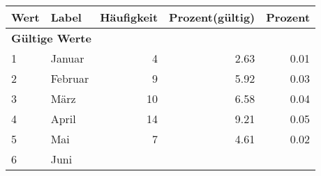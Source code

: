      \begin{longtable}{lXrrr}
     \toprule
     \textbf{Wert} & \textbf{Label} & \textbf{Häufigkeit} & \textbf{Prozent(gültig)} & \textbf{Prozent} \\
     \endhead
     \midrule
     \multicolumn{5}{l}{\textbf{Gültige Werte}}\\

     1 &
     \multicolumn{1}{X}{ Januar   } &


       \num{4} &
       \num[round-mode=places,round-precision=2]{2.63} &
         \num[round-mode=places,round-precision=2]{0.01} \\

     2 &
     \multicolumn{1}{X}{ Februar   } &


       \num{9} &
       \num[round-mode=places,round-precision=2]{5.92} &
         \num[round-mode=places,round-precision=2]{0.03} \\

     3 &
     \multicolumn{1}{X}{ März   } &


       \num{10} &
       \num[round-mode=places,round-precision=2]{6.58} &
         \num[round-mode=places,round-precision=2]{0.04} \\

     4 &
     \multicolumn{1}{X}{ April   } &


       \num{14} &
       \num[round-mode=places,round-precision=2]{9.21} &
         \num[round-mode=places,round-precision=2]{0.05} \\

     5 &
     \multicolumn{1}{X}{ Mai   } &


       \num{7} &
       \num[round-mode=places,round-precision=2]{4.61} &
         \num[round-mode=places,round-precision=2]{0.02} \\

     6 &
     \multicolumn{1}{X}{ Juni   } &



\end{longtable}
